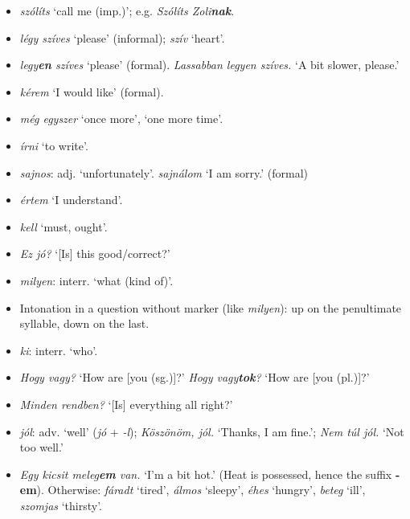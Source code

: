 \documentclass[a4paper,11pt]{article}
\begin{document}
\begin{itemize}
  \item \emph{szólíts} `call me (imp.)'; e.g. \emph{Szólíts
  Zoli\textbf{nak}}.

  \item \emph{légy szíves} `please' (informal); \emph{szív} `heart'.

  \item \emph{legy\textbf{en} szíves} `please'
    (formal). \emph{Lassabban legyen szíves.} `A bit slower, please.'

  \item \emph{kérem} `I would like' (formal).

  \item  \emph{még egyszer} `once more', `one more time'.

  \item \emph{írni} `to write'.

  \item \emph{sajnos}: adj. `unfortunately'. \emph{sajnálom} `I am
    sorry.' (formal)

  \item \emph{értem} `I understand'.

  \item \emph{kell} `must, ought'.

  \item \emph{Ez jó?} `[Is] this good/correct?'

  \item \emph{milyen}: interr. `what (kind of)'.

  \item Intonation in a question without marker (like \emph{milyen}):
    up on the penultimate syllable, down on the last.

  \item \emph{ki}: interr. `who'.

  \item \emph{Hogy vagy?} `How are [you (sg.)]?' \emph{Hogy
  vagy\textbf{tok}?} `How are [you (pl.)]?'

  \item \emph{Minden rendben?} `[Is] everything all right?'

  \item \emph{jól}: adv. `well' (\emph{jó} + \emph{-l});
    \emph{Köszönöm, jól.} `Thanks, I am fine.'; \emph{Nem túl jól.}
    `Not too well.'

  \item \emph{Egy kicsit meleg\textbf{em} van.} `I'm a bit hot.'
    (Heat is possessed, hence the suffix \textbf{-em}). Otherwise:
    \emph{fáradt} `tired', \emph{álmos} `sleepy', \emph{éhes}
    `hungry', \emph{beteg} `ill', \emph{szomjas} `thirsty'.


\end{itemize}
\end{document}
